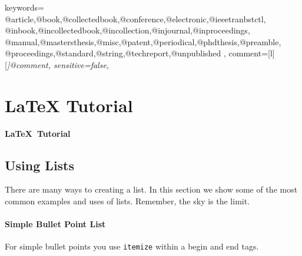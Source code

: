 {
    keywords={%
        @article,@book,@collectedbook,@conference,@electronic,@ieeetranbstctl,%
        @inbook,@incollectedbook,@incollection,@injournal,@inproceedings,%
        @manual,@mastersthesis,@misc,@patent,@periodical,@phdthesis,@preamble,%
        @proceedings,@standard,@string,@techreport,@unpublished%
    },
    comment=[l][\itshape]{@comment},
    sensitive=false,
}




\chapter{{\LaTeX} Tutorial}
\pagebreak

\begin{center}
{\LARGE\textbf{\LaTeX\ Tutorial}}
\end{center}

\section{Using Lists}
\label{sec:using_lists}

There are many ways to creating a list. In this section we show some of the most common examples and uses of lists. Remember, the sky is the limit.

\subsubsection{Simple Bullet Point List}

For simple bullet points you use \verb|itemize| within a begin and end tags. 

